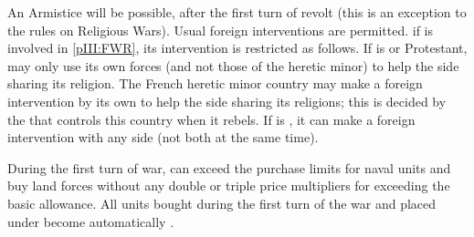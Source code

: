 \phdipl
\aparag An Armistice will be possible, after the first turn of revolt (this is
an exception to the rules on Religious Wars).
\aparag Usual foreign interventions are permitted.  if \FRA is involved in
\ref{pIII:FWR}, its intervention is restricted as follows.
\bparag If \FRA is \CATHCR or Protestant, \FRA may only use its own forces
(and not those of the heretic minor) to help the side sharing its
religion. The French heretic minor country may make a foreign intervention by
its own to help the side sharing its religions; this is decided by the \MAJ
that controls this country when it rebels.
\bparag If \FRA is \CATHCO, it can make a foreign intervention with any side
(not both at the same time).

\phadm
\aparag During the first turn of war, \HOL can exceed the purchase limits for
naval units and buy land forces without any double or triple price multipliers
for exceeding the basic allowance.
\aparag\label{onlyfirstrevolt5} All units bought during the first turn of the
war and placed under  become automatically \Veteran.

